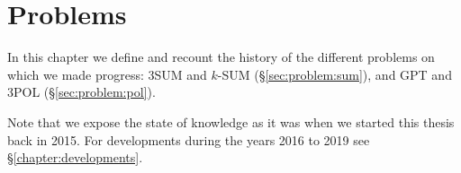 \chapter{Problems}

In this chapter we define and recount the history of the different problems on
which we made progress:
%
3SUM and \(k\)-SUM (\S\ref{sec:problem:sum}),
and
GPT and 3POL (\S\ref{sec:problem:pol}).

Note that we expose the state of knowledge as it was when we started this
thesis back in 2015. For developments during the years 2016 to 2019 see
\S\ref{chapter:developments}.



